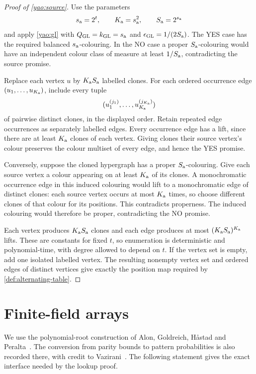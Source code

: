 \documentclass[11pt]{article} \usepackage[utf8]{inputenc}
\theoremstyle{plain} \newtheorem{theorem}{Theorem}[section]
\theoremstyle{definition} \newaliascnt{definition}{theorem}
\begin{document}
\begin{proof}[Proof of \cref{yao:source}]
Use the parameters
\[
s_{\rm a}=2^t,\qquad K_{\rm a}=s_{\rm a}^2,\qquad
S_{\rm a}=2^{s_{\rm a}}
\]
and apply \cref{yao:gl} with
$Q_{\rm GL}=k_{\rm GL}=s_{\rm a}$ and
$\epsilon_{\rm GL}=1/(2S_{\rm a})$.
The YES case has the required balanced $s_{\rm a}$-colouring. In the NO case
a proper $S_{\rm a}$-colouring would have an independent colour class of
measure at least $1/S_{\rm a}$, contradicting the source promise.

Replace each vertex $u$ by $K_{\rm a}S_{\rm a}$ labelled clones. For each
ordered occurrence edge $(u_1,\ldots,u_{K_{\rm a}})$, include every tuple
\[
(u_1^{(j_1)},\ldots,u_{K_{\rm a}}^{(j_{K_{\rm a}})})
\]
of pairwise distinct clones, in the displayed order. Retain repeated edge
occurrences as separately labelled edges. Every occurrence edge has a lift,
since there are at least $K_{\rm a}$ clones of each vertex. Giving clones
their source vertex's colour preserves the colour multiset of every edge,
and hence the YES promise.

Conversely, suppose the cloned hypergraph has a proper $S_{\rm a}$-colouring.
Give each source vertex a colour appearing on at least $K_{\rm a}$ of its
clones. A monochromatic occurrence edge in this induced colouring would lift
to a monochromatic edge of distinct clones: each source vertex occurs at
most $K_{\rm a}$ times, so choose different clones of that colour for its
positions. This contradicts properness. The induced colouring would therefore
be proper, contradicting the NO promise.

Each vertex produces $K_{\rm a}S_{\rm a}$ clones and each edge produces at
most $(K_{\rm a}S_{\rm a})^{K_{\rm a}}$ lifts. These are constants for fixed
$t$, so enumeration is deterministic and polynomial-time, with degree allowed
to depend on $t$. If the vertex set is empty, add one isolated labelled
vertex. The resulting nonempty vertex set and ordered edges of distinct
vertices give exactly the position map required by
\cref{def:alternating-table}.
\end{proof}

\section{Finite-field arrays}\label{sec:arrays}
\label{sec:alternating_implementation}

We use the polynomial-root construction of Alon, Goldreich,
H{\aa}stad and Peralta~\cite[Construction~3 and Proposition~3]{alon1992smallbias}.
The conversion from parity bounds to pattern probabilities is also recorded
there, with credit to Vazirani~\cite[Lemma~1 and Corollary~1]{alon1992smallbias}.
The following statement gives the exact interface needed by the lookup proof.
\end{document}
